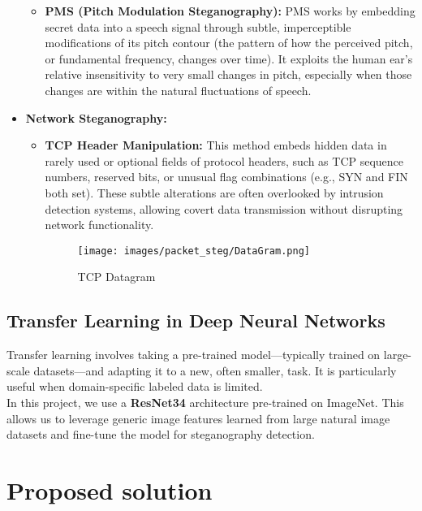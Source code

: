 \documentclass[12pt]{article}
\begin{document}
\begin{itemize}
\begin{itemize}
    \item \textbf{PMS (Pitch Modulation Steganography):} PMS works by embedding secret data into a speech signal through subtle, imperceptible modifications of its pitch contour (the pattern of how the perceived pitch, or fundamental frequency, changes over time). It exploits the human ear's relative insensitivity to very small changes in pitch, especially when those changes are within the natural fluctuations of speech.
    

  \end{itemize}
  
  
  \item \textbf{Network Steganography:}
  \begin{itemize}
    \item \textbf{TCP Header Manipulation:} This method embeds hidden data in rarely used or optional fields of protocol headers, such as TCP sequence numbers, reserved bits, or unusual flag combinations (e.g., SYN and FIN both set). These subtle alterations are often overlooked by intrusion detection systems, allowing covert data transmission without disrupting network functionality.

    \begin{figure}[H]
    \centering
    \texttt{[image: images/packet\_steg/DataGram.png]}
    \caption{TCP Datagram}
    \end{figure}
    


  \end{itemize}
\end{itemize}

\subsection{Transfer Learning in Deep Neural Networks}

Transfer learning involves taking a pre-trained model—typically trained on large-scale datasets—and adapting it to a new, often smaller, task. It is particularly useful when domain-specific labeled data is limited.\vspace{0.3cm} \\
In this project, we use a \textbf{ResNet34} architecture pre-trained on ImageNet. This allows us to leverage generic image features learned from large natural image datasets and fine-tune the model for steganography detection. 


\newpage

\section{Proposed solution }
\end{document}
